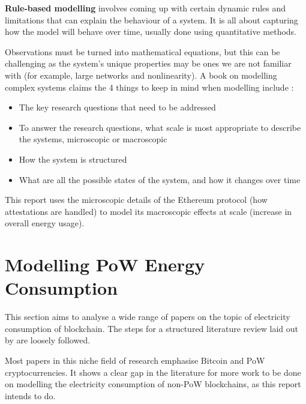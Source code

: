 \textbf{Rule-based modelling} involves coming up with certain dynamic rules and limitations that can explain the behaviour of a system. It is all about capturing how the model will behave over time, usually done using quantitative methods.

Observations must be turned into mathematical equations, but this can be challenging as the system's unique properties may be ones we are not familiar with (for example, large networks and nonlinearity). A book on modelling complex systems claims the 4 things to keep in mind when modelling include \cite{SayamaINTRODUCTIONSYSTEMS}:

\begin{itemize}
    \item The key research questions that need to be addressed
    \item To answer the research questions, what scale is most appropriate to describe the systems, microscopic or macroscopic
    \item How the system is structured
    \item What are all the possible states of the system, and how it changes over time
\end{itemize}

This report uses the microscopic details of the Ethereum protocol (how attestations are handled) to model its macroscopic effects at scale (increase in overall energy usage). 







\section{Modelling PoW Energy Consumption}

This section aims to analyse a wide range of papers on the topic of electricity consumption of blockchain. The steps for a structured literature review laid out by \cite{Crosby2015BlockChainBitcoin} are loosely followed. 

Most papers in this niche field of research emphasise Bitcoin and PoW cryptocurrencies. It shows a clear gap in the literature for more work to be done on modelling the electricity consumption of non-PoW blockchains, as this report intends to do.

